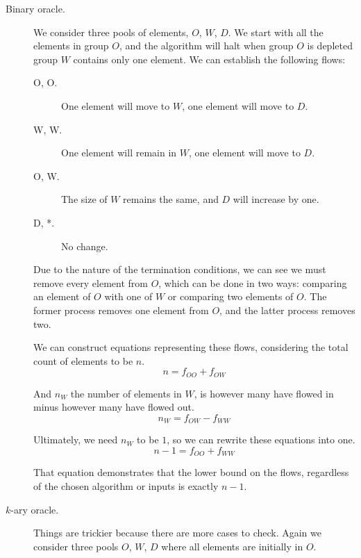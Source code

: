 \documentclass{article}
\begin{document}
\begin{description}
    \item[Binary oracle.] We consider three pools of elements, $O$, $W$, $D$.
        We start with all the elements in group $O$, and the algorithm will
        halt when group $O$ is depleted group $W$ contains only one element. We
        can establish the following flows:
        \begin{description}
            \item[O, O.] One element will move to $W$, one element will move to
                $D$.
            \item[W, W.] One element will remain in $W$, one element will move
                to $D$.
            \item[O, W.] The size of $W$ remains the same, and $D$ will
                increase by one.
            \item[D, *.] No change.
        \end{description}

        Due to the nature of the termination conditions, we can see we must
        remove every element from $O$, which can be done in two ways: comparing
        an element of $O$ with one of $W$ or comparing two elements of $O$. The
        former process removes one element from $O$, and the latter process
        removes two.

        We can construct equations representing these flows, considering the
        total count of elements to be $n$.
        \begin{equation*}
            n = f_{OO} + f_{OW}
        \end{equation*}

        And $n_W$ the number of elements in $W$, is however many have flowed in
        minus however many have flowed out.
        \begin{equation*}
            n_W = f_{OW} - f_{WW}
        \end{equation*}

        Ultimately, we need $n_W$ to be $1$, so we can rewrite these equations
        into one.
        \begin{equation*}
            n - 1 = f_{OO} + f_{WW}
        \end{equation*}

        That equation demonstrates that the lower bound on the flows,
        regardless of the chosen algorithm or inputs is exactly $n - 1$.

    \item[$k$-ary oracle.] Things are trickier because there are more cases to
        check. Again we consider three pools $O$, $W$, $D$ where all elements
        are initially in $O$.


\end{description}
\end{document}
